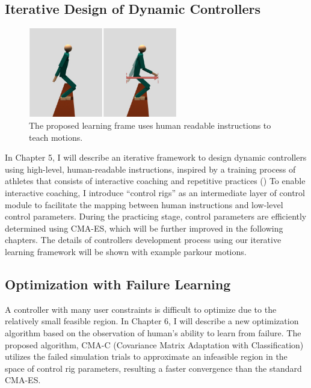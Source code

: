 \subsection{Iterative Design of Dynamic Controllers}
\begin{figure}
 \vspace{-10pt}
  \begin{center}
    \includegraphics[width=0.58\textwidth]{images/intro_teach.png}
  \end{center}
   \vspace{-25pt}
  \caption{The proposed learning frame uses human readable instructions
    to teach motions.}
  \label{fig:intro_teach}
   \vspace{-10pt}
\end{figure}
In Chapter 5, I will describe an iterative framework to design dynamic
controllers using high-level, human-readable instructions,
inspired by a training process of athletes that consists of
interactive coaching and repetitive practices ()
To enable interactive coaching, I introduce ``control rigs'' as
an intermediate layer of control module to facilitate the mapping between
human instructions and low-level control parameters.
During the practicing stage, control parameters are efficiently determined
using CMA-ES, which will be further improved in the following chapters.
The details of controllers development process using our iterative learning
framework will be shown with example parkour motions.

\subsection{Optimization with Failure Learning}
A controller with many user constraints is difficult to optimize due to the
relatively small feasible region.
In Chapter 6, I will describe a new optimization algorithm based on the
observation of human’s ability to learn from failure.
The proposed algorithm, CMA-C (Covariance Matrix Adaptation with
Classification) utilizes the failed simulation trials to approximate 
an infeasible region in the space of control rig parameters, resulting a
faster convergence than the standard CMA-ES.

